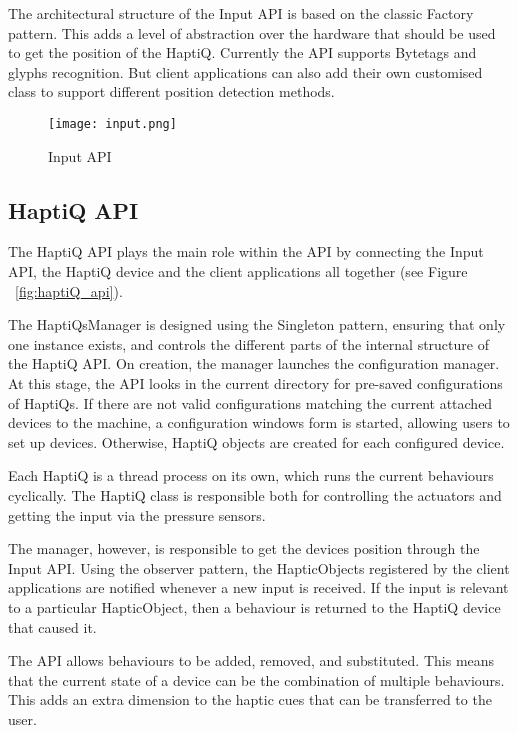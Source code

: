 The architectural structure of the Input API is based on the classic Factory pattern. This adds a level of abstraction over the hardware that should be used to get the position of the HaptiQ. Currently the API supports Bytetags and glyphs recognition. But client applications can also add their own customised class to support different position detection methods. 

\begin{figure}[H]
  \centering
  \texttt{[image: input.png]}
  \caption{Input API}
  \label{fig:input_api}
\end{figure}

\subsection{HaptiQ API}

The HaptiQ API plays the main role within the API by connecting the Input API, the HaptiQ device and the client applications all together (see Figure ~\ref{fig:haptiQ_api}). 

The HaptiQsManager is designed using the Singleton pattern, ensuring that only one instance exists, and controls the different parts of the internal structure of the HaptiQ API. On creation, the manager launches the configuration manager. At this stage, the API looks in the current directory for pre-saved configurations of HaptiQs. If there are not valid configurations matching the current attached devices to the machine, a configuration windows form is started, allowing users to set up devices. Otherwise, HaptiQ objects are created for each configured device. 

Each HaptiQ is a thread process on its own, which runs the current behaviours cyclically. The HaptiQ class is responsible both for controlling the actuators and getting the input via the pressure sensors. 

The manager, however, is responsible to get the devices position through the Input API. Using the observer pattern, the HapticObjects registered by the client applications are notified whenever a new input is received. If the input is relevant to a particular HapticObject, then a behaviour is returned to the HaptiQ device that caused it. 

The API allows behaviours to be added, removed, and substituted. This means that the current state of a device can be the combination of multiple behaviours. This adds an extra dimension to the haptic cues that can be transferred to the user. 

